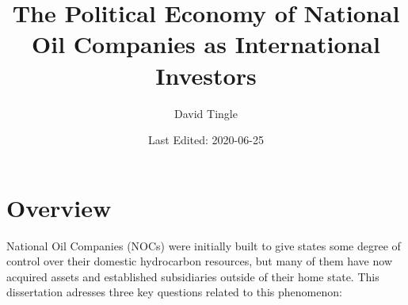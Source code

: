 \documentclass[11pt,]{book}
\title{The Political Economy of National Oil Companies as International Investors}
\author{David Tingle}
\date{Last Edited: 2020-06-25}
\begin{document}
\maketitle

{
\setcounter{tocdepth}{1}
\tableofcontents
}
\hypertarget{overview}{%
\chapter*{Overview}\label{overview}}

National Oil Companies (NOCs) were initially built to give states some degree of control over their domestic hydrocarbon resources, but many of them have now acquired assets and established subsidiaries outside of their home state. This dissertation adresses three key questions related to this phenomenon:
\end{document}
